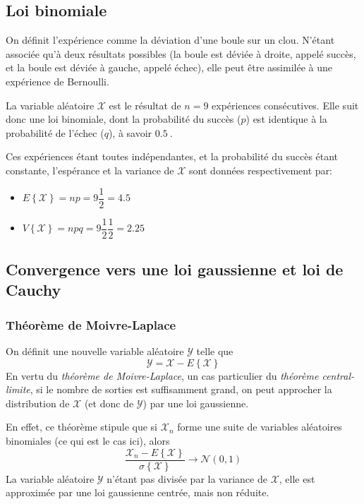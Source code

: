 \documentclass[a4paper, 12pt]{article}
\begin{document}
    \subsection{Loi binomiale}
    On définit l'expérience comme la déviation d'une boule sur un clou. N'étant associée qu'à deux résultats possibles (la boule est déviée à droite, appelé \og succès\fg{}, et la boule est déviée à gauche, appelé \og échec\fg{}), elle peut être assimilée à une expérience de Bernoulli.\par
    La variable aléatoire \(\mathcal{X}\) est le résultat de \(n = 9\) expériences consécutives. Elle suit donc une loi binomiale, dont la probabilité du succès (\(p\)) est identique à la probabilité de l'échec (\(q\)), à savoir \(\SI{0.5}{}\).\par
    Ces expériences étant toutes indépendantes, et la probabilité du succès étant constante, l'espérance et la variance de \(\mathcal{X}\) sont données respectivement par:
    \begin{itemize}
        \item \(E\left\{\mathcal{X}\right\} = np = 9\dfrac{1}{2} = \SI{4.5}{}\)
        \item \(V\left\{\mathcal{X}\right\} = npq = 9\dfrac{1}{2}\dfrac{1}{2} = \SI{2.25}{}\)
    \end{itemize}
    \subsection{Convergence vers une loi gaussienne et loi de Cauchy}
    \subsubsection*{Théorème de Moivre-Laplace}
    On définit une nouvelle variable aléatoire \(\mathcal{Y}\) telle que
    \begin{displaymath}
        \mathcal{Y} = \mathcal{X} - E\left\{\mathcal{X}\right\}
    \end{displaymath}
    En vertu du \textit{théorème de Moivre-Laplace}, un cas particulier du \textit{théorème central-limite}, si le nombre de sorties est suffisamment grand, on peut approcher la distribution de \(\mathcal{X}\) (et donc de \(\mathcal{Y}\)) par une loi gaussienne.\par
    En effet, ce théorème stipule que si \(\mathcal{X}_n\) forme une suite de variables aléatoires binomiales (ce qui est le cas ici), alors
    \begin{displaymath}
        \dfrac{\mathcal{X}_n - E\left\{\mathcal{X}\right\}}{\sigma\left\{\mathcal{X}\right\}}\rightarrow\mathcal{N}\left(0, 1\right)
    \end{displaymath}
    La variable aléatoire \(\mathcal{Y}\) n'étant pas divisée par la variance de \(\mathcal{X}\), elle est approximée par une loi gaussienne centrée, mais non réduite.
\end{document}

